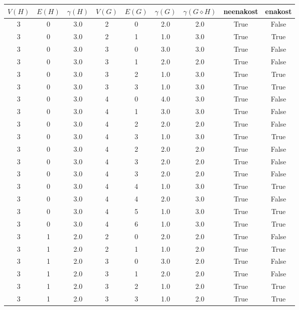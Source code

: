 \documentclass[a4paper,12pt]{article}
\begin{document}
\begin{center}
    \begin{tabular}{ c c c | c c c | c | c | c}
        $V(H)$ & $E(H)$ & $\gamma(H)$ & $V(G)$ & $E(G)$ & $\gamma(G)$ & $\gamma(G \diamond H)$ & neenakost & enakost \\
        \hline
        3 & 0 & 3.0 & 2 & 0 & 2.0 & 2.0 & True & False    \\
        3 & 0 & 3.0 & 2 & 1 & 1.0 & 3.0 & True & True     \\
        3 & 0 & 3.0 & 3 & 0 & 3.0 & 3.0 & True & False    \\
        3 & 0 & 3.0 & 3 & 1 & 2.0 & 2.0 & True & False    \\
        3 & 0 & 3.0 & 3 & 2 & 1.0 & 3.0 & True & True     \\
        3 & 0 & 3.0 & 3 & 3 & 1.0 & 3.0 & True & True     \\
        3 & 0 & 3.0 & 4 & 0 & 4.0 & 3.0 & True & False    \\
        3 & 0 & 3.0 & 4 & 1 & 3.0 & 3.0 & True & False    \\
        3 & 0 & 3.0 & 4 & 2 & 2.0 & 2.0 & True & False    \\
        3 & 0 & 3.0 & 4 & 3 & 1.0 & 3.0 & True & True     \\
        3 & 0 & 3.0 & 4 & 2 & 2.0 & 2.0 & True & False    \\
        3 & 0 & 3.0 & 4 & 3 & 2.0 & 2.0 & True & False    \\
        3 & 0 & 3.0 & 4 & 3 & 2.0 & 2.0 & True & False    \\
        3 & 0 & 3.0 & 4 & 4 & 1.0 & 3.0 & True & True     \\
        3 & 0 & 3.0 & 4 & 4 & 2.0 & 3.0 & True & False    \\
        3 & 0 & 3.0 & 4 & 5 & 1.0 & 3.0 & True & True     \\
        3 & 0 & 3.0 & 4 & 6 & 1.0 & 3.0 & True & True     \\
        3 & 1 & 2.0 & 2 & 0 & 2.0 & 2.0 & True & False    \\
        3 & 1 & 2.0 & 2 & 1 & 1.0 & 2.0 & True & True     \\
        3 & 1 & 2.0 & 3 & 0 & 3.0 & 2.0 & True & False    \\
        3 & 1 & 2.0 & 3 & 1 & 2.0 & 2.0 & True & False    \\
        3 & 1 & 2.0 & 3 & 2 & 1.0 & 2.0 & True & True     \\
        3 & 1 & 2.0 & 3 & 3 & 1.0 & 2.0 & True & True     \\

\end{tabular}
\end{center}
\end{document}
